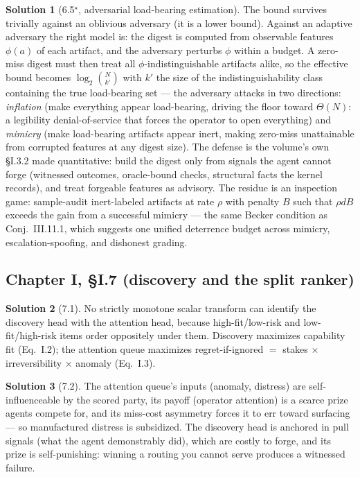 \documentclass[11pt,a4paper]{article}
\theoremstyle{definition}
\newtheorem{sol}{Solution}
\theoremstyle{remark}
\begin{document}
\begin{sol}[6.5$^\star$, adversarial load-bearing estimation]\label{sol:65}
The bound survives trivially against an oblivious adversary (it is a lower bound). Against an adaptive adversary the right model is: the digest is computed from observable features $\phi(a)$ of each artifact, and the adversary perturbs $\phi$ within a budget. A zero-miss digest must then treat all $\phi$-indistinguishable artifacts alike, so the effective bound becomes $\log_2\binom{N}{k'}$ with $k'$ the size of the indistinguishability class containing the true load-bearing set --- the adversary attacks in two directions: \emph{inflation} (make everything appear load-bearing, driving the floor toward $\Theta(N)$: a legibility denial-of-service that forces the operator to open everything) and \emph{mimicry} (make load-bearing artifacts appear inert, making zero-miss unattainable from corrupted features at any digest size). The defense is the volume's own \S I.3.2 made quantitative: build the digest only from signals the agent cannot forge (witnessed outcomes, oracle-bound checks, structural facts the kernel records), and treat forgeable features as advisory. The residue is an inspection game: sample-audit inert-labeled artifacts at rate $\rho$ with penalty $B$ such that $\rho d B$ exceeds the gain from a successful mimicry --- the same Becker condition as Conj.~III.11.1, which suggests one unified deterrence budget across mimicry, escalation-spoofing, and dishonest grading.
\end{sol}

\subsection{Chapter I, \S I.7 (discovery and the split ranker)}

\begin{sol}[7.1]
No strictly monotone scalar transform can identify the discovery head with the attention head, because high-fit/low-risk and low-fit/high-risk items order oppositely under them. Discovery maximizes capability fit (Eq.~I.2); the attention queue maximizes regret-if-ignored $=$ stakes $\times$ irreversibility $\times$ anomaly (Eq.~I.3).
\end{sol}

\begin{sol}[7.2]
The attention queue's inputs (anomaly, distress) are self-influenceable by the scored party, its payoff (operator attention) is a scarce prize agents compete for, and its miss-cost asymmetry forces it to err toward surfacing --- so manufactured distress is subsidized. The discovery head is anchored in pull signals (what the agent demonstrably did), which are costly to forge, and its prize is self-punishing: winning a routing you cannot serve produces a witnessed failure.
\end{sol}
\end{document}
